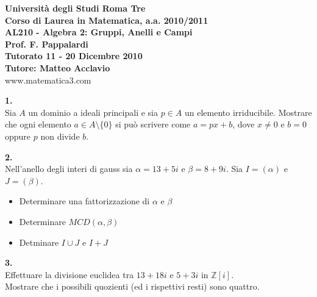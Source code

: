 \documentclass[italian,a4paper,11pt]
{article}
\newcommand{\Z}{\mathbb Z}
\newcommand{\acc}{\`}
\begin{document}
\begin{center}

\textbf{Universit\`a degli Studi Roma Tre}\\

\textbf{Corso di Laurea in Matematica, a.a. 2010/2011}\\

\textbf{AL210 - Algebra 2: Gruppi, Anelli e Campi}\\

\textbf{Prof. F. Pappalardi}\\

\textbf{Tutorato 11 - 20 Dicembre 2010}\\

\textbf{Tutore: Matteo Acclavio}\\

www.matematica3.com\\
\end{center}

\vspace{0.2 cm}
\noindent
\begin{Ex}\textbf{ 1.}\\
Sia $A$ un dominio a ideali principali e sia $p\in A$ un elemento
irriducibile. Mostrare che ogni elemento $a \in A \setminus \{0\}$ si pu\acc o scrivere
come $a = px + b$, dove $x\neq 0$ e $b = 0$ oppure $p$ non divide $b$.
\end{Ex}

\vspace{0.2 cm}
\noindent
\begin{Ex}\textbf{ 2.}\\
Nell'anello degli interi di gauss sia $\alpha=13+5i$ e $\beta=8+9i$. Sia $I=(\alpha)$ e $J=(\beta)$.
\begin{itemize}
 \item Determinare una fattorizzazione di $\alpha$ e $\beta$
 \item Determinare $MCD(\alpha , \beta)$
  \item Detminare $I\cup J$ e $I+J$
\end{itemize}

\end{Ex}

\vspace{0.2 cm}
\noindent
\begin{Ex}\textbf{ 3.}\\
Effettuare la divisione euclidea tra $13 + 18i$ e $5 + 3i$ in $\Z[i]$.\\ Mostrare che i possibili
quozienti (ed i rispettivi resti) sono quattro.
\end{Ex}
\end{document}
